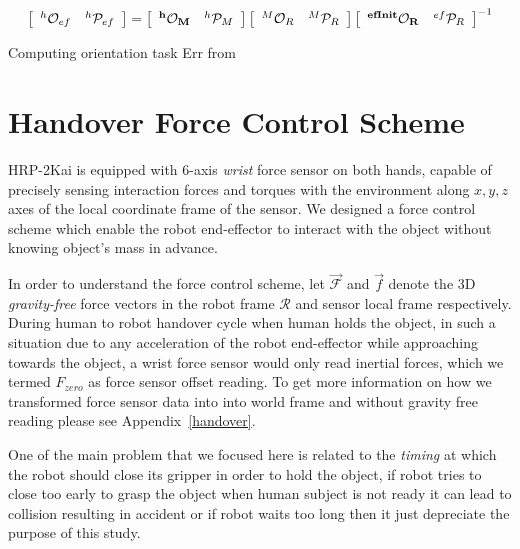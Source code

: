 \begin{gather}\label{X_efinit_hori}
\left[\begin{array}{cc}
{}^{h}\mathcal{O}_{ef} & {}^{h}\mathcal{P}_{ef}
\end{array}\right] =
\left[\begin{array}{cc}
\bf{{}^{h}\mathcal{O}_M} & {}^{h}\mathcal{P}_M
\end{array}\right]
\left[\begin{array}{cc}
{}^{M}\mathcal{O}_R & {}^{M}\mathcal{P}_R
\end{array}\right]
\left[\begin{array}{cc}
\bf{{}^{efInit}\mathcal{O}_{R}} & {}^{ef}\mathcal{P}_{R}
\end{array}\right]^{-1}
\end{gather}

Computing orientation task Err from~\cite{ladder-HRP-2Kai}


\clearpage
\section{Handover Force Control Scheme}

HRP-2Kai is equipped with 6-axis \textit{wrist} force sensor on both hands, capable of precisely sensing interaction forces and torques with the environment along $x, y, z$ axes of the local coordinate frame of the sensor. We designed a force control scheme which enable the robot end-effector to interact with the object without knowing object's mass in advance.

In order to understand the force control scheme, let $\mathcal{\vec{F}}$ and $\vec{f}$ denote the 3D \textit{gravity-free} force vectors in the robot frame $\mathcal{R}$ and sensor local frame respectively. During human to robot handover cycle when human holds the object, in such a situation due to any acceleration of the robot end-effector while approaching towards the object, a wrist force sensor would only read inertial forces, which we termed $F_{zero}$ as force sensor offset reading. To get more information on how we transformed force sensor data into into world frame and without gravity free reading please see Appendix~\ref{handover}.

One of the main problem that we focused here is related to the \textit{timing} at which the robot should close its gripper in order to hold the object, if robot tries to close too early to grasp the object when human subject is not ready it can lead to collision resulting in accident or if robot waits too long then it just depreciate the purpose of this study.

